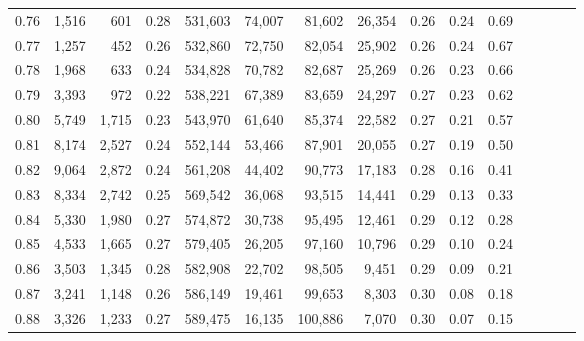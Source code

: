 \begin{tabular}{rrrcrrrrrrrrrrr}
0.76 &   1,516 &    601 &                                       0.28 &  531,603 &   74,007 &   81,602 &   26,354 &  0.26 &  0.24 &                         0.69 \\
0.77 &   1,257 &    452 &                                       0.26 &  532,860 &   72,750 &   82,054 &   25,902 &  0.26 &  0.24 &                         0.67 \\
0.78 &   1,968 &    633 &                                       0.24 &  534,828 &   70,782 &   82,687 &   25,269 &  0.26 &  0.23 &                         0.66 \\
0.79 &   3,393 &    972 &                                       0.22 &  538,221 &   67,389 &   83,659 &   24,297 &  0.27 &  0.23 &                         0.62 \\
0.80 &   5,749 &  1,715 &                                       0.23 &  543,970 &   61,640 &   85,374 &   22,582 &  0.27 &  0.21 &                         0.57 \\
0.81 &   8,174 &  2,527 &                                       0.24 &  552,144 &   53,466 &   87,901 &   20,055 &  0.27 &  0.19 &                         0.50 \\
0.82 &   9,064 &  2,872 &                                       0.24 &  561,208 &   44,402 &   90,773 &   17,183 &  0.28 &  0.16 &                         0.41 \\
0.83 &   8,334 &  2,742 &                                       0.25 &  569,542 &   36,068 &   93,515 &   14,441 &  0.29 &  0.13 &                         0.33 \\
0.84 &   5,330 &  1,980 &                                       0.27 &  574,872 &   30,738 &   95,495 &   12,461 &  0.29 &  0.12 &                         0.28 \\
0.85 &   4,533 &  1,665 &                                       0.27 &  579,405 &   26,205 &   97,160 &   10,796 &  0.29 &  0.10 &                         0.24 \\
0.86 &   3,503 &  1,345 &                                       0.28 &  582,908 &   22,702 &   98,505 &    9,451 &  0.29 &  0.09 &                         0.21 \\
0.87 &   3,241 &  1,148 &                                       0.26 &  586,149 &   19,461 &   99,653 &    8,303 &  0.30 &  0.08 &                         0.18 \\
0.88 &   3,326 &  1,233 &                                       0.27 &  589,475 &   16,135 &  100,886 &    7,070 &  0.30 &  0.07 &                         0.15 \\

\end{tabular}
